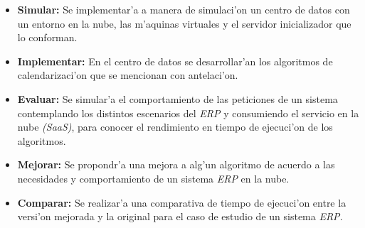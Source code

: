 \begin{itemize}
	\item \textbf{Simular:} Se implementar'a a manera de simulaci'on un centro de datos con un entorno en la nube, las m'aquinas virtuales y el servidor inicializador que lo conforman.
	\item \textbf{Implementar:} En el centro de datos se desarrollar'an los algoritmos de calendarizaci'on que se mencionan con antelaci'on.
	\item \textbf{Evaluar:} Se simular'a el comportamiento de las peticiones de un sistema contemplando los distintos escenarios del \textit{ERP} y consumiendo el servicio en la nube \textit{(SaaS)}, para conocer el rendimiento en tiempo de ejecuci'on de los algoritmos.
	\item \textbf{Mejorar:} Se propondr'a una mejora a alg'un algoritmo de acuerdo a las necesidades y comportamiento de un sistema \textit{ERP} en la nube.
	\item \textbf{Comparar:} Se realizar'a una comparativa de tiempo de ejecuci'on entre la versi'on mejorada y la original para el caso de estudio de un sistema \textit{ERP}.
\end{itemize}




